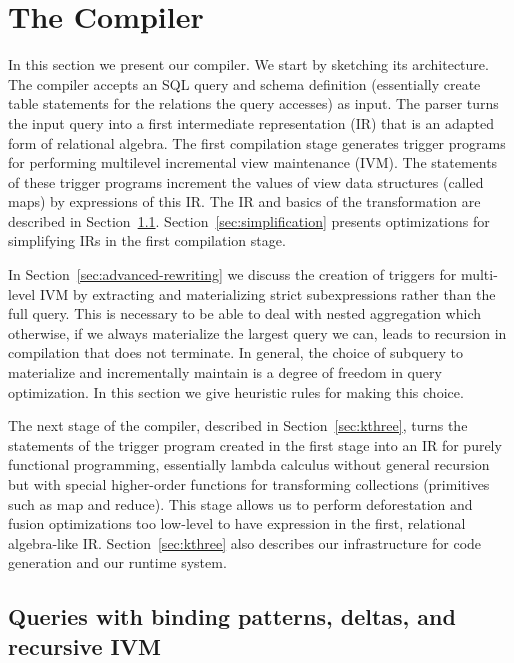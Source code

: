 \section{The Compiler}
\label{sec:compiler}


In this section we present our compiler. We start by sketching its architecture.
%
The compiler accepts an SQL query and schema definition (essentially create table statements for the relations the query accesses) as input. The parser turns the input query into a first intermediate representation (IR) that is an adapted form of relational algebra. The first compilation stage generates trigger programs for performing multilevel incremental view maintenance (IVM). The statements of these trigger programs increment the values of view data structures (called maps) by expressions of this IR. The IR and basics of the transformation are described in Section~\ref{sec:compiler_calc}. Section~\ref{sec:simplification} presents optimizations for simplifying IRs in the first compilation stage.

In Section~\ref{sec:advanced-rewriting} we discuss the creation of triggers for multi-level IVM by extracting and materializing strict subexpressions rather than the full query. This is necessary to be able to deal with nested aggregation which otherwise, if we always materialize the largest query we can, leads to recursion in compilation that does not terminate. In general, the choice of subquery to materialize and incrementally maintain is a degree of freedom in query optimization. In this section we give heuristic rules for making this choice.

The next stage of the compiler, described in Section~\ref{sec:kthree}, turns the statements of the trigger program created in the first stage into an IR for purely functional programming, essentially lambda calculus without general recursion but with special higher-order functions for transforming collections (primitives such as map and reduce). This stage allows us to perform deforestation and fusion optimizations too low-level to have expression in the first, relational algebra-like IR.
Section~\ref{sec:kthree} also describes our infrastructure for code generation and our runtime system.




\subsection{Queries with binding patterns, deltas, and recursive IVM}
\label{sec:compiler_calc}


